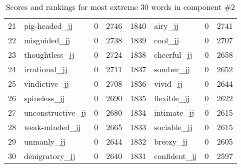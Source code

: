 \begin{table}[tbp]
\begin{tabular}{| rlr@{.}l | rlr@{.}l |}
    21 & pig-headed\_jj & 0 & 2746    &    1840 & airy\_jj & 0 & 2741 \\
    22 & misguided\_jj & 0 & 2738    &    1839 & cool\_jj & 0 & 2707 \\
    23 & thoughtless\_jj & 0 & 2724    &    1838 & cheerful\_jj & 0 & 2658 \\
    24 & irrational\_jj & 0 & 2711    &    1837 & somber\_jj & 0 & 2652 \\
    25 & vindictive\_jj & 0 & 2708    &    1836 & vivid\_jj & 0 & 2644 \\
    26 & spineless\_jj & 0 & 2690    &    1835 & flexible\_jj & 0 & 2622 \\
    27 & unconstructive\_jj & 0 & 2680    &    1834 & intimate\_jj & 0 & 2615 \\
    28 & weak-minded\_jj & 0 & 2665    &    1833 & sociable\_jj & 0 & 2615 \\
    29 & unmanly\_jj & 0 & 2644    &    1832 & breezy\_jj & 0 & 2605 \\
    30 & denigratory\_jj & 0 & 2640    &    1831 & confident\_jj & 0 & 2597 \\
    \hline
    \end{tabular}
    \caption{Scores and rankings for most extreme 30 words in component \#2} 
\end{table}
\clearpage
